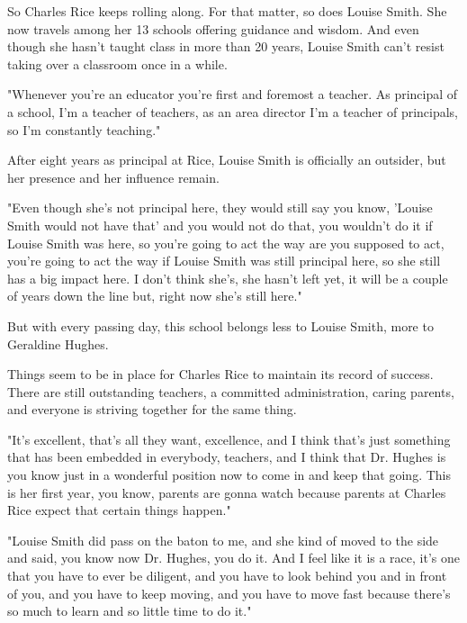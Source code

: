 So Charles Rice keeps rolling along. For that matter, so does Louise Smith. She now travels among her 13 schools offering guidance and wisdom. And even though she hasn't taught class in more than 20 years, Louise Smith can't resist taking over a classroom once in a while.

"Whenever you're an educator you're first and foremost a teacher. As principal of a school, I'm a teacher of teachers, as an area director I'm a teacher of principals, so I'm constantly teaching."

After eight years as principal at Rice, Louise Smith is officially an outsider, but her presence and her influence remain.

"Even though she's not principal here, they would still say you know, 'Louise Smith would not have that' and you would not do that, you wouldn't do it if Louise Smith was here, so you're going to act the way are you supposed to act, you're going to act the way if Louise Smith was still principal here, so she still has a big impact here. I don't think she's, she hasn't left yet, it will be a couple of years down the line but, right now she's still here."

But with every passing day, this school belongs less to Louise Smith, more to Geraldine Hughes.

Things seem to be in place for Charles Rice to maintain its record of success. There are still outstanding teachers, a committed administration, caring parents, and everyone is striving together for the same thing.

"It's excellent, that's all they want, excellence, and I think that's just something that has been embedded in everybody, teachers, and I think that Dr. Hughes is you know just in a wonderful position now to come in and keep that going. This is her first year, you know, parents are gonna watch because parents at Charles Rice expect that certain things happen."

"Louise Smith did pass on the baton to me, and she kind of moved to the side and said, you know now Dr. Hughes, you do it. And I feel like it is a race, it's one that you have to ever be diligent, and you have to look behind you and in front of you, and you have to keep moving, and you have to move fast because there's so much to learn and so little time to do it."